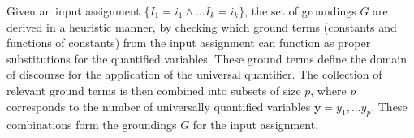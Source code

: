 Given an input assignment $\{I_1\!=\!i_1 \land ... I_k\!=\!i_k\}$, the set of groundings $G$ are derived in a heuristic manner, by checking which ground terms (constants and functions of constants) from the input assignment can function as proper substitutions for the quantified variables.  These ground terms define the domain of discourse for the application of the universal quantifier. The collection of relevant ground terms is then combined into subsets of size $p$, where $p$ corresponds to the number of universally quantified variables $\mathbf{y} = y_1, ... y_p$. These combinations form the groundings $G$ for the input assignment. 



 

 
